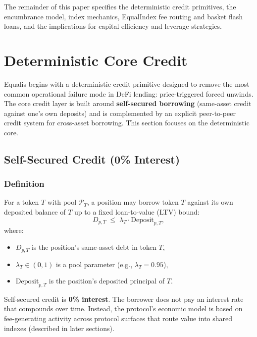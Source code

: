 \documentclass[version=preprint]{iacrcc}
\begin{document}
The remainder of this paper specifies the deterministic credit primitives, the encumbrance model, index mechanics, EqualIndex fee routing and basket flash loans, and the implications for capital efficiency and leverage strategies.


\section{Deterministic Core Credit}

Equalis begins with a deterministic credit primitive designed to remove the most common operational failure mode in DeFi lending: price-triggered forced unwinds. The core credit layer is built around \textbf{self-secured borrowing} (same-asset credit against one’s own deposits) and is complemented by an explicit peer-to-peer credit system for cross-asset borrowing. This section focuses on the deterministic core.

\subsection{Self-Secured Credit (0\% Interest)}

\subsubsection{Definition}

For a token $T$ with pool $\mathcal{P}_T$, a position may borrow token $T$ against its own deposited balance of $T$ up to a fixed loan-to-value (LTV) bound:
\[
D_{p,T} \;\le\; \lambda_T \cdot \text{Deposit}_{p,T},
\]
where:
\begin{itemize}
  \item $D_{p,T}$ is the position’s same-asset debt in token $T$,
  \item $\lambda_T \in (0,1)$ is a pool parameter (e.g., $\lambda_T = 0.95$),
  \item $\text{Deposit}_{p,T}$ is the position’s deposited principal of $T$.
\end{itemize}

Self-secured credit is \textbf{0\% interest}. The borrower does not pay an interest rate that compounds over time. Instead, the protocol’s economic model is based on fee-generating activity across protocol surfaces that route value into shared indexes (described in later sections).
\end{document}
